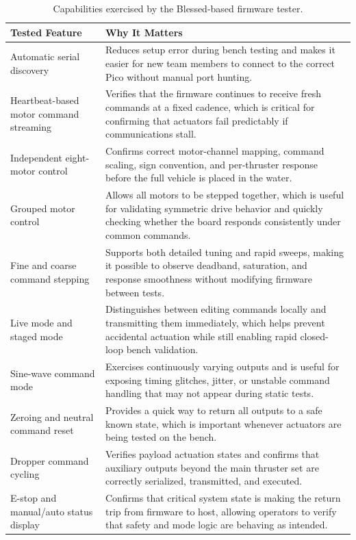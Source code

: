 \documentclass[conference]{IEEEtran}
\begin{document}
\begin{table}[htbp]
\caption{Capabilities exercised by the Blessed-based firmware tester.}
\label{tab:blessed_tester}
\begin{center}
\begin{tabularx}{\columnwidth}{|p{}|X|}
\hline
\textbf{Tested Feature} & \textbf{Why It Matters} \\
\hline
Automatic serial discovery & Reduces setup error during bench testing and makes it easier for new team members to connect to the correct Pico without manual port hunting. \\
\hline
Heartbeat-based motor command streaming & Verifies that the firmware continues to receive fresh commands at a fixed cadence, which is critical for confirming that actuators fail predictably if communications stall. \\
\hline
Independent eight-motor control & Confirms correct motor-channel mapping, command scaling, sign convention, and per-thruster response before the full vehicle is placed in the water. \\
\hline
Grouped motor control & Allows all motors to be stepped together, which is useful for validating symmetric drive behavior and quickly checking whether the board responds consistently under common commands. \\
\hline
Fine and coarse command stepping & Supports both detailed tuning and rapid sweeps, making it possible to observe deadband, saturation, and response smoothness without modifying firmware between tests. \\
\hline
Live mode and staged mode & Distinguishes between editing commands locally and transmitting them immediately, which helps prevent accidental actuation while still enabling rapid closed-loop bench validation. \\
\hline
Sine-wave command mode & Exercises continuously varying outputs and is useful for exposing timing glitches, jitter, or unstable command handling that may not appear during static tests. \\
\hline
Zeroing and neutral command reset & Provides a quick way to return all outputs to a safe known state, which is important whenever actuators are being tested on the bench. \\
\hline
Dropper command cycling & Verifies payload actuation states and confirms that auxiliary outputs beyond the main thruster set are correctly serialized, transmitted, and executed. \\
\hline
E-stop and manual/auto status display & Confirms that critical system state is making the return trip from firmware to host, allowing operators to verify that safety and mode logic are behaving as intended. \\

\end{tabularx}
\end{center}
\end{table}
\end{document}
